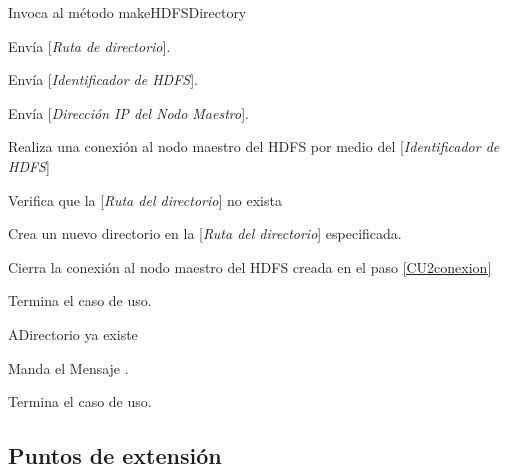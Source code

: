 
\begin{UCtrayectoria}

\UCpaso[\UCactor] Invoca al método makeHDFSDirectory

\UCpaso[\UCactor] Envía [{\em Ruta de directorio}].

\UCpaso[\UCactor] Envía [{\em Identificador de HDFS}].

\UCpaso[\UCactor] Envía [{\em Dirección IP del Nodo Maestro}].

\UCpaso[\UCsist] Realiza una conexión al nodo maestro del HDFS por medio del [{\em Identificador de HDFS}]\label{CU2conexion}

\UCpaso[\UCsist] Verifica que la [{\em Ruta del directorio}] no exista 

\UCpaso[\UCsist] Crea un nuevo directorio en la [{\em Ruta del directorio}] especificada.

\UCpaso[\UCsist] Cierra la conexión al nodo maestro del HDFS creada en el paso \ref{CU2conexion}

\UCpaso[] Termina el caso de uso.

\end{UCtrayectoria}




\begin{UCtrayectoriaA}{A}{Directorio ya existe}

	\UCpaso Manda el Mensaje .

	\UCpaso[] Termina el caso de uso.

\end{UCtrayectoriaA}


\subsection{Puntos de extensión}

